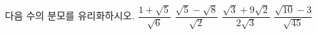 다음 수의 분모를 유리화하시오.
 $\dfrac{1+\sqrt{5}}{\sqrt{6}}$
 $\dfrac{\sqrt{5}-\sqrt{8}}{\sqrt{2}}$
 $\dfrac{\sqrt{3}+9\sqrt{2}}{2\sqrt{3}}$
 $\dfrac{\sqrt{10}-3}{\sqrt{45}}$
